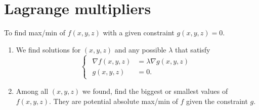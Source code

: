 
\setcounter{section}{17}
\section{Lagrange multipliers}
To find max/min of $f(x,y,z)$ with a given constraint $g(x,y,z)=0$. 
\begin{enumerate}
    \item We find solutions for $(x,y,z)$ and any possible $\lambda$ that satisfy
    \begin{equation*}
        \begin{cases}
        \begin{aligned}
            \nabla f(x,y,z) &= \lambda \nabla g(x,y,z) \\
                   g(x,y,z) &= 0.
        \end{aligned}
        \end{cases}
    \end{equation*}
    \item Among all $(x,y,z)$ we found, find the biggest or smallest values of $f(x,y,z)$. They are potential absolute max/min of $f$ given the constraint $g$.
\end{enumerate}

